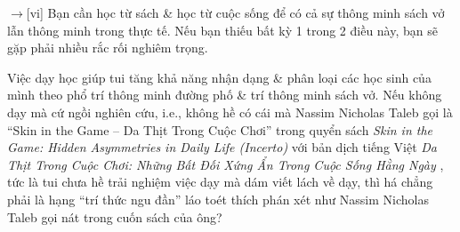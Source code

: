 \documentclass[12pt,twoside]{book}
\begin{document}
{\sf[en]$\to$[vi]} Bạn cần học từ sách \& học từ cuộc sống để có cả sự thông minh sách vở lẫn thông minh trong thực tế. Nếu bạn thiếu bất kỳ 1 trong 2 điều này, bạn sẽ gặp phải nhiều rắc rối nghiêm trọng.

Việc dạy học giúp tui tăng khả năng nhận dạng \& phân loại các học sinh của mình theo phổ trí thông minh đường phố \& trí thông minh sách vở. Nếu không dạy mà cứ ngồi nghiên cứu, i.e., không hề có cái mà {\sc Nassim Nicholas Taleb} gọi là ``Skin in the Game -- Da Thịt Trong Cuộc Chơi'' trong quyển sách {\it Skin in the Game: Hidden Asymmetries in Daily Life (Incerto)} \cite{Taleb_skin_game} với bản dịch tiếng Việt {\it Da Thịt Trong Cuộc Chơi: Những Bất Đối Xứng Ẩn Trong Cuộc Sống Hằng Ngày} \cite{Taleb_skin_game_VN}, tức là tui chưa hề trải nghiệm việc dạy mà dám viết lách về dạy, thì há chẳng phải là hạng ``trí thức ngu đần'' láo toét  thích phán xét như {\sc Nassim Nicholas Taleb} gọi nát trong cuốn sách của ông?
\end{document}

